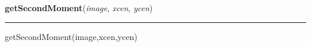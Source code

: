     \label{multireg:chainMoments:getSecondMoment}
    \vspace{0.5ex}

    \begin{boxedminipage}{\textwidth}

    \raggedright \textbf{getSecondMoment}(\textit{image}, \textit{xcen}, \textit{ycen})

    \vspace{-1.5ex}

    \rule{\textwidth}{0.5\fboxrule}
    getSecondMoment(image,xcen,ycen)

    \vspace{1ex}

    \end{boxedminipage}

